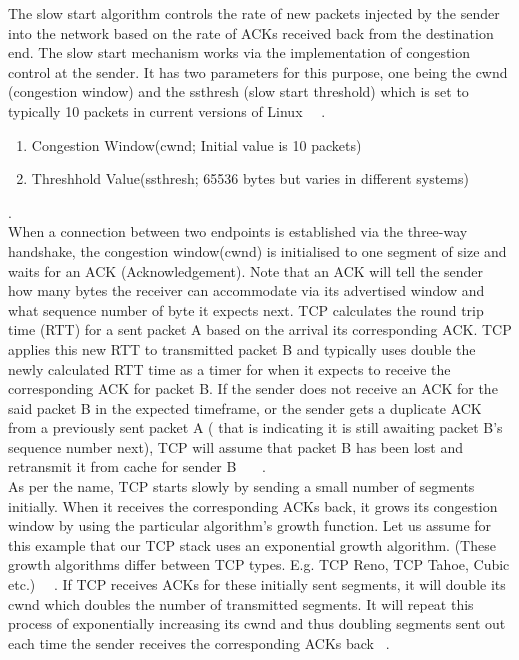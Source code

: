 The slow start algorithm controls the rate of new packets injected by the sender into the network based on the rate of ACKs received back from the destination end. The slow start mechanism works via the implementation of congestion control at the sender. It has two parameters for this purpose, one being the cwnd (congestion window) and the ssthresh (slow start threshold) which is set to typically 10 packets in current versions of Linux ~\cite{17}~\cite{18}. \\

\begin{enumerate}
\item Congestion Window(cwnd; Initial value is 10 packets)
\item Threshhold Value(ssthresh; 65536 bytes but varies in different systems)
\end{enumerate}.
\\

When a connection between two endpoints is established via the three-way handshake, the congestion window(cwnd) is initialised to one segment of size and waits for an ACK (Acknowledgement). Note that an ACK will tell the sender how many bytes the receiver can accommodate via its advertised window and what sequence number of byte it expects next. TCP calculates the round trip time (RTT) for a sent packet A based on the arrival its corresponding ACK. TCP applies this new RTT to transmitted packet B and typically uses double the newly calculated RTT time as a timer for when it expects to receive the corresponding ACK for packet B. If the sender does not receive an ACK for the said packet B in the expected timeframe, or the sender gets a duplicate ACK from a previously sent packet A ( that is indicating it is still awaiting packet B's sequence number next), TCP will assume that packet B has been lost and retransmit it from cache for sender B ~\cite{1}~\cite{2}~\cite{17}. \\

As per the name, TCP starts slowly by sending a small number of segments initially. When it receives the corresponding ACKs back, it grows its congestion window by using the particular algorithm's growth function. Let us assume for this example that our TCP stack uses an exponential growth algorithm. (These growth algorithms differ between TCP types. E.g. TCP Reno, TCP Tahoe, Cubic etc.) ~\cite{14}~\cite{17}.  If TCP receives ACKs for these initially sent segments, it will double its cwnd which doubles the number of transmitted segments. It will repeat this process of exponentially increasing its cwnd and thus doubling segments sent out each time the sender receives the corresponding ACKs back ~\cite{17}.\\

